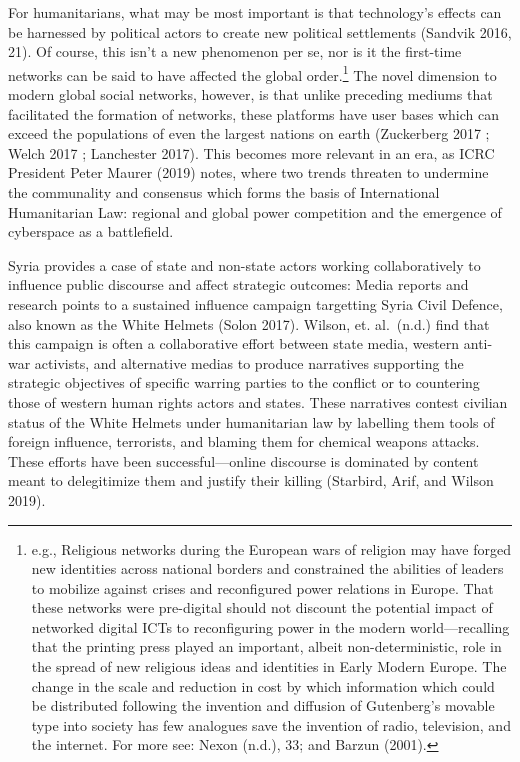 \documentclass[
]{article}
\begin{document}
For humanitarians, what may be most important is that technology's
effects can be harnessed by political actors to create new political
settlements (Sandvik 2016, 21). Of course, this isn't a new phenomenon
per se, nor is it the first-time networks can be said to have affected
the global order.\footnote{e.g., Religious networks during the European
  wars of religion may have forged new identities across national
  borders and constrained the abilities of leaders to mobilize against
  crises and reconfigured power relations in Europe. That these networks
  were pre-digital should not discount the potential impact of networked
  digital ICTs to reconfiguring power in the modern world---recalling
  that the printing press played an important, albeit non-deterministic,
  role in the spread of new religious ideas and identities in Early
  Modern Europe. The change in the scale and reduction in cost by which
  information which could be distributed following the invention and
  diffusion of Gutenberg's movable type into society has few analogues
  save the invention of radio, television, and the internet. For more
  see: Nexon (n.d.), 33; and Barzun (2001).} The novel dimension to
modern global social networks, however, is that unlike preceding mediums
that facilitated the formation of networks, these platforms have user
bases which can exceed the populations of even the largest nations on
earth (Zuckerberg 2017 ; Welch 2017 ; Lanchester 2017). This becomes
more relevant in an era, as ICRC President Peter Maurer (2019) notes,
where two trends threaten to undermine the communality and consensus
which forms the basis of International Humanitarian Law: regional and
global power competition and the emergence of cyberspace as a
battlefield.

Syria provides a case of state and non-state actors working
collaboratively to influence public discourse and affect strategic
outcomes: Media reports and research points to a sustained influence
campaign targetting Syria Civil Defence, also known as the White Helmets
(Solon 2017). Wilson, et. al.~(n.d.) find that this campaign is often a
collaborative effort between state media, western anti-war activists,
and alternative medias to produce narratives supporting the strategic
objectives of specific warring parties to the conflict or to countering
those of western human rights actors and states. These narratives
contest civilian status of the White Helmets under humanitarian law by
labelling them tools of foreign influence, terrorists, and blaming them
for chemical weapons attacks. These efforts have been
successful---online discourse is dominated by content meant to
delegitimize them and justify their killing (Starbird, Arif, and Wilson
2019).
\end{document}
